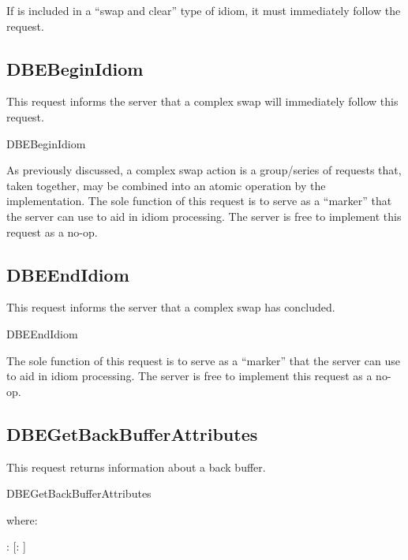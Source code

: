 If  is included in a ``swap and clear''
type of idiom, it must immediately follow the 
request.

\subsection{DBEBeginIdiom}

This request informs the server that a complex swap will immediately
follow this request.  

\begin{arequest}{DBEBeginIdiom}
\end{arequest}

As previously discussed, a complex swap action is a group/series of
requests that, taken together, may be combined into an atomic
operation by the implementation.  The sole function of this request is
to serve as a ``marker'' that the server can use to aid in idiom
processing.  The server is free to implement this request as a no-op.

\subsection{DBEEndIdiom}

This request informs the server that a complex swap has concluded.  

\begin{arequest}{DBEEndIdiom}
\end{arequest}

The sole function of this request is to serve as a ``marker'' that the
server can use to aid in idiom processing.  The server is free to
implement this request as a no-op.


\subsection{DBEGetBackBufferAttributes}

This request returns information about a back buffer.

\begin{arequest}{DBEGetBackBufferAttributes}
\areply
{}
\end{arequest}

where:

: [:  ]

